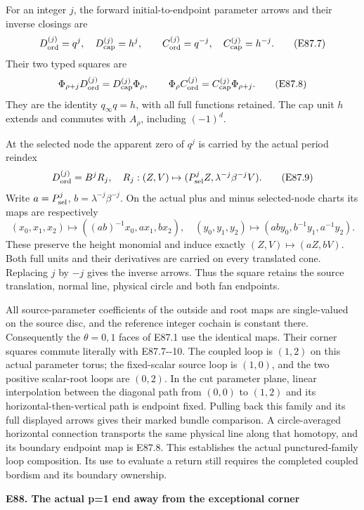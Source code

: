 For an integer \(j\), the forward initial-to-endpoint
parameter arrows and their inverse closings are
\[
 D_{\rm ord}^{(j)}=q^j,\quad D_{\rm cap}^{(j)}=h^j,
 \qquad
 C_{\rm ord}^{(j)}=q^{-j},\quad C_{\rm cap}^{(j)}=h^{-j}.
 \tag{E87.7}
\]
Their two typed squares are
\[
 \Phi_{\rho+j}D_{\rm ord}^{(j)}
     =D_{\rm cap}^{(j)}\Phi_\rho,\qquad
 \Phi_\rho C_{\rm ord}^{(j)}
     =C_{\rm cap}^{(j)}\Phi_{\rho+j}.
 \tag{E87.8}
\]
They are the identity \(q_\infty q=h\), with all full
functions retained. The cap unit \(h\) extends and
commutes with \(A_\rho\), including \((-1)^d\).

At the selected node the apparent zero of \(q^j\) is
carried by the actual period reindex
\[
 D_{\rm ord}^{(j)}=B^jR_j,
 \quad R_j:(Z,V)\mapsto(P_{\rm sel}^jZ,
                          \lambda^{-j}\beta^{-j}V).
 \tag{E87.9}
\]
Write \(a=P_{\rm sel}^j\), \(b=\lambda^{-j}\beta^{-j}\).
On the actual plus and minus selected-node charts its
maps are respectively
\[
 (x_0,x_1,x_2)\mapsto((ab)^{-1}x_0,ax_1,bx_2),
 \quad
 (y_0,y_1,y_2)\mapsto(ab y_0,b^{-1}y_1,a^{-1}y_2).
 \tag{E87.10}
\]
These preserve the height monomial and induce exactly
\((Z,V)\mapsto(aZ,bV)\). Both full units and their
derivatives are carried on every translated cone.
Replacing \(j\) by \(-j\) gives the inverse arrows.
Thus the square retains the source translation,
normal line, physical circle and both fan endpoints.

All source-parameter coefficients of the outside and
root maps are single-valued on the source disc, and
the reference integer cochain is constant there.
Consequently the \(\theta=0,1\) faces of E87.1 use the
identical maps. Their corner squares commute literally
with E87.7-\/-10. The coupled loop is \((1,2)\) on this
actual parameter torus; the fixed-scalar source loop
is \((1,0)\), and the two positive scalar-root loops
are \((0,2)\). In the cut parameter plane, linear
interpolation between the diagonal path from \((0,0)\)
to \((1,2)\) and its horizontal-then-vertical path is
endpoint fixed. Pulling back this family and its full
displayed arrows gives their marked bundle comparison.
A circle-averaged horizontal connection transports
the same physical line along that homotopy, and its
boundary endpoint map is E87.8. This establishes the
actual punctured-family loop composition. Its use to
evaluate a return still requires the completed coupled
bordism and its boundary ownership.

\par

\medskip\noindent\textbf{E88. The actual p=1 end away from the exceptional corner}

